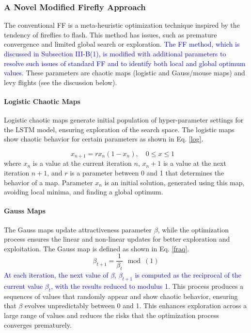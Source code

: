 \documentclass[journal]{IEEEtran}
\begin{document}
\subsubsection{A Novel Modified Firefly Approach}

The conventional FF is a meta-heuristic optimization technique inspired by the tendency of fireflies to flash. This method has issues, such as premature convergence and limited global search or exploration. \textcolor{blue}{The FF method, which is discussed in Subsection III-B(1), is modified with additional parameters to resolve such issues of standard FF \cite{FF} and to identify both local and global optimum values.} These parameters are chaotic maps (logistic and Gauss/mouse maps) and levy flights (see the discussion below). 

\paragraph{Logistic Chaotic Maps}
Logistic chaotic maps generate initial population of hyper-parameter settings for the LSTM model, ensuring exploration of the search space. The logistic maps show chaotic behavior for certain parameters as shown in Eq. \eqref{log}.


\begin{equation}\label{log}
    x_{n+1} = r x_n (1 - x_n), \quad 0 \leq x \leq 1 \quad 
\end{equation}
where \(x_n\) is a value at the current iteration \(n\), \(x_n+1\) is a value at the next iteration \(n+1\), and \(r\) is a parameter between 0 and 1 that determines the behavior of a map. Parameter \(x_n\) is an initial solution, generated using this map, avoiding local minima, and finding a global optimum.




\paragraph{Gauss Maps}
The Gauss maps update attractiveness parameter $\beta$, while the optimization process ensures the linear and non-linear updates for better exploration and exploitation. The Gauss map is defined as shown in Eq. \eqref{fraq}. 
\begin{equation}
\label{fraq}
{\beta_{t+1}} = \frac{1}{\beta_t}{\mod(1)}
\end{equation}
\textcolor{blue}{At each iteration, the next value of $\beta$, $\beta_{t+1}$ is computed as the reciprocal of the current value $\beta_t$, with the results reduced to modulus 1.} This process produces a sequences of values that randomly appear and show chaotic behavior, ensuring that $\beta$ evolves unpredictably between 0 and 1. This enhances exploration across a large range of values and reduces the risks that the optimization process converges prematurely.
\end{document}
